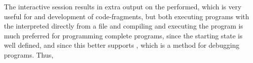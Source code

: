 The interactive session results in extra output on the  performed, which is very useful for  and development of code-fragments, but both executing programs with the interpreted directly from a file and compiling and executing the program is much preferred for programming complete programs, since the starting state is well defined, and since this better supports , which is a method for debugging programs. Thus, 


